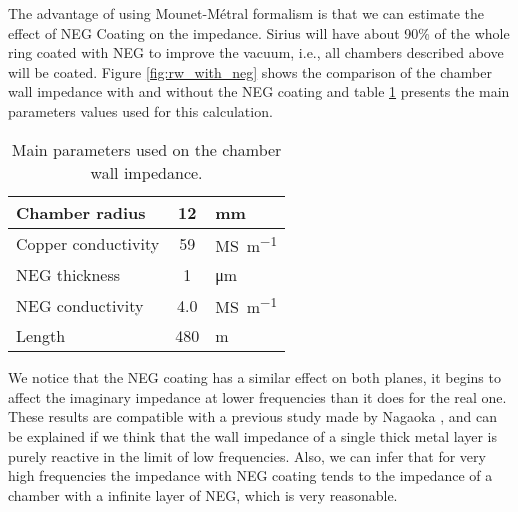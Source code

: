 
The advantage of using Mounet-Métral formalism is that we can estimate the effect of NEG Coating on the impedance. Sirius will have about 90\% of the whole ring coated with NEG to improve the vacuum, i.e., all chambers described above will be coated. Figure \ref{fig:rw_with_neg} shows the comparison of the chamber wall impedance with and without the NEG coating and table \ref{tab:rw_with_neg} presents the main parameters values used for this calculation. 

\begin{table}[!b]
 \centering
 \caption{Main parameters used on the chamber wall impedance.}
 \label{tab:rw_with_neg}
 \begin{tabular}{lcl}\hline
  Chamber radius      & 12               & \si{\milli\meter} \\\hline
  Copper conductivity\cite{matwebsite} & 59 & \si{\mega\siemens\per\meter} \\\hline
  NEG thickness       & 1                & \si{\micro\meter}   \\\hline
  NEG conductivity    & 4.0              & \si{\mega\siemens\per\meter} \\\hline
 Length               & 480              & \si{\meter}   \\\hline
 \end{tabular}
\end{table}

We notice that the NEG coating has a similar effect on both planes, it begins to affect the imaginary impedance at lower frequencies than it does for the real one. These results are compatible with a previous study made by Nagaoka \cite{nagaoka2004}, and can be explained if we think that the wall impedance of a single thick metal layer is purely reactive in the limit of low frequencies. Also, we can infer that for very high frequencies the impedance with NEG coating tends to the impedance of a chamber with a infinite layer of NEG, which is very reasonable.

